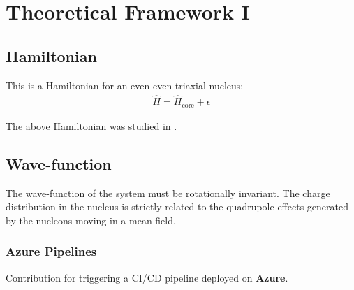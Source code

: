 \chapter{Theoretical Framework I}

\section{Hamiltonian}

This is a Hamiltonian for an even-even triaxial nucleus:
\begin{align}
    \hat{H}=\hat{H}_\text{core}+\epsilon
\end{align}

The above Hamiltonian was studied in \cite{frauendorf1997tilted,raduta2006description,raduta2016new,poenaru2021parity}.

\lipsum[1-2]

\section{Wave-function}

The wave-function of the system must be rotationally invariant. The charge distribution in the nucleus is strictly related to the quadrupole effects generated by the nucleons moving in a mean-field.

\subsection{Azure Pipelines}

Contribution for triggering a CI/CD pipeline deployed on \textbf{Azure}.

\lipsum[1-2]